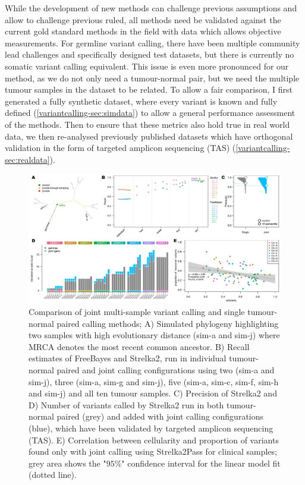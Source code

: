 While the development of new methods can challenge previous assumptions and allow to challenge previous ruled, all methods need be validated against the current gold standard methods in the field with data which allows objective measurements. For germline variant calling, there have been multiple community lead challenges and specifically designed test datasets, but there is currently no somatic variant calling equivalent. This issue is even more pronounced for our method, as we do not only need a tumour-normal pair, but we need the multiple tumour samples in the dataset to be related. To allow a fair comparison, I first generated a fully synthetic dataset, where every variant is known and fully defined (\autoref{variantcalling-sec:simdata}) to allow a general performance assessment of the methods. Then to ensure that these metrics also hold true in real world data, we then re-analysed previously published datasets which have orthogonal validation in the form of targeted amplicon sequencing (TAS) (\autoref{variantcalling-sec:realdata}).

\begin{figure}[!tpb]
\centering
  \includegraphics[width=\textwidth]{Appendices/Variantcalling/Figure_1}\vspace*{-12pt}
  \caption[Comparison of joint multi-sample and single tumour-normal paired variant calling methods]{Comparison of joint multi-sample variant calling and single tumour-normal paired calling methods; A) Simulated phylogeny highlighting two samples with high evolutionary distance (sim-a and sim-j) where MRCA denotes the most recent common ancestor. B) Recall estimates of FreeBayes and Strelka2, run in individual tumour-normal paired and joint calling configurations using two (sim-a and sim-j), three (sim-a, sim-g and sim-j), five (sim-a, sim-c, sim-f, sim-h and sim-j) and all ten tumour samples. C) Precision of Strelka2 and D) Number of variants called by Strelka2 run in both tumour-normal paired (grey) and added with joint calling configurations (blue), which have been validated by targeted amplicon sequencing (TAS). E) Correlation between cellularity and proportion of variants found only with joint calling using Strelka2Pass for clinical samples; grey area shows the "$95\%$" confidence interval for the linear model fit (dotted line).}\label{fig:varcalling:fig1}
\end{figure}

